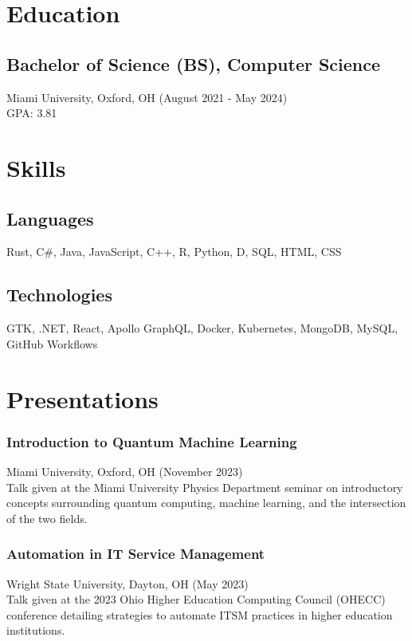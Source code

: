 \documentclass[letterpaper,9pt]{extarticle}
\begin{document}
    \begin{minipage}[t]{0.3\textwidth}
        \section*{Education}
        \subsection*{Bachelor of Science (BS), Computer Science}
        Miami University, Oxford, OH (August 2021 - May 2024)\\
        GPA\@: 3.81\\

        \section*{Skills}
        \subsection*{Languages}
        Rust, C\#, Java, JavaScript, C++, R, Python, D, SQL, HTML, CSS\\
        \subsection*{Technologies}
        GTK, .NET, React, Apollo GraphQL, Docker, Kubernetes, MongoDB, MySQL, GitHub Workflows\\

        \section*{Presentations}
        \subsubsection*{Introduction to Quantum Machine Learning}
        Miami University, Oxford, OH (November 2023)\\
        Talk given at the Miami University Physics Department seminar on introductory concepts surrounding quantum computing, machine learning, and the intersection of the two fields.\\
        \subsubsection*{Automation in IT Service Management}
        Wright State University, Dayton, OH (May 2023)\\
        Talk given at the 2023 Ohio Higher Education Computing Council (OHECC) conference detailing strategies to automate ITSM practices in higher education institutions.
    \end{minipage}
\end{document}
